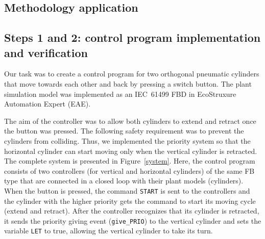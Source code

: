 \begin{bibunit}

\section {Methodology application}
\label{sec:methodappl}
\subsection{Steps 1 and 2: control program implementation and verification}

Our task was to create a control program for two orthogonal pneumatic cylinders that move towards each other and back by pressing a switch button. The plant simulation model was implemented as an IEC~61499 FBD in EcoStruxure Automation Expert (EAE).

The aim of the controller was to allow both cylinders to extend and retract once the button was pressed. The following safety requirement was to prevent the cylinders from colliding.
Thus, we implemented the priority system so that the horizontal cylinder can start moving only when the vertical cylinder is retracted. The complete system is presented in Figure~\ref{system}. Here, the control program consists of two controllers (for vertical and horizontal cylinders) of the same FB type that are connected in a closed loop with their plant models (cylinders). When the button is pressed, the command \texttt{START} is sent to the controllers and the cylinder with the higher priority gets the command to start its moving cycle (extend and retract). After the controller recognizes that its cylinder is retracted, it sends the priority giving event (\texttt{give\_PRIO}) to the vertical cylinder and sets the variable \texttt{LET} to true, allowing the vertical cylinder to take its turn.





\end{bibunit}
